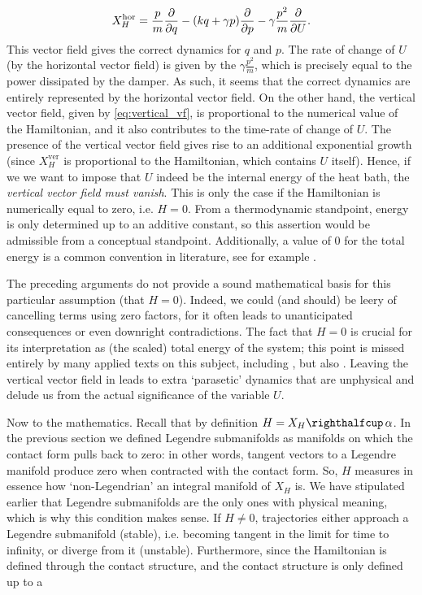 $$ 
    X^\text{hor}_H = \frac{p}{m}\pdv{}{q} - ( kq + \gamma p)\pdv{}{p} - \gamma \frac{p^2}{m}\pdv{}{U}.
$$
This vector field gives the correct dynamics for $q$ and $p$. The rate of change of $U$ (by the horizontal vector field) is given by the $ 
\gamma \frac{p^2}{m}$, which is precisely equal to the power dissipated by the damper. As such, it seems that the correct dynamics are entirely represented by the horizontal vector field. On the other hand, the vertical vector field, given by \cref{eq:vertical_vf}, is proportional to the numerical value of the Hamiltonian, and it also contributes to the time-rate of change of $U$. The presence of the vertical vector field gives rise to an additional exponential growth (since $X_H^\text{ver}$ is proportional to the Hamiltonian, which contains $U$ itself). Hence, if we we want to impose that $U$ indeed be the internal energy of the heat bath, the \emph{vertical vector field must vanish}. This is only the case if the Hamiltonian is numerically equal to zero, i.e. $H = 0$. From a thermodynamic standpoint, energy is only determined up to an additive constant, so this assertion would be admissible from a conceptual standpoint. Additionally, a value of 0 for the total energy is a common convention in literature, see for example \citet{Fermi1936}. 

The preceding arguments do not provide a sound mathematical basis for this particular assumption (that $H = 0$). Indeed, we could (and should) be leery of cancelling terms using zero factors, for it often leads to unanticipated consequences or even downright contradictions. The fact that $H = 0$ is crucial for its interpretation as (the scaled) total energy of the system; this point is missed entirely by many applied texts on this subject, including \citet{Bravetti2017}, but also \citet{valcazar2019}. Leaving the vertical vector field in leads to extra `parasetic' dynamics that are unphysical and delude us from the actual significance of the variable $U$.

Now to the mathematics. Recall that by definition $H = \intpr{X_H}{\alpha}$. In the previous section we defined Legendre submanifolds as manifolds on which the contact form pulls back to zero: in other words, tangent vectors to a Legendre manifold produce zero when contracted with the contact form. So, $H$ measures in essence how `non-Legendrian' an integral manifold of $X_H$ is. We have stipulated earlier that Legendre submanifolds are the only ones with physical meaning, which is why this condition makes sense. If $H \neq 0$, trajectories either approach a Legendre submanifold (stable), i.e. becoming tangent in the limit for time to infinity, or diverge from it (unstable). Furthermore, since the Hamiltonian is defined through the contact structure, and the contact structure is only defined up to a 


